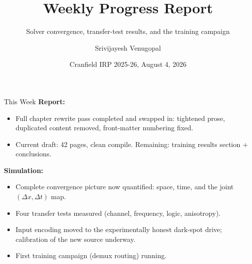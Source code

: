 \documentclass[aspectratio=169,11pt]{beamer}
\title{Weekly Progress Report}
\subtitle{Solver convergence, transfer-test results, and the training campaign}
\author{Srivijayesh Venugopal}
\date{Cranfield IRP 2025-26, August 4, 2026}
\begin{document}
\begin{frame}
\titlepage
\end{frame}

\begin{frame}{This Week}
    \textbf{Report:}
    \begin{itemize}
        \item Full chapter rewrite pass completed and swapped in: tightened prose, duplicated content removed, front-matter numbering fixed.
        \item Current draft: 42 pages, clean compile. Remaining: training results section + conclusions.
    \end{itemize}

    \vspace{0.3cm}
    \textbf{Simulation:}
    \begin{itemize}
        \item Complete convergence picture now quantified: space, time, and the joint $(\Delta x, \Delta t)$ map.
        \item Four transfer tests measured (channel, frequency, logic, anisotropy).
        \item Input encoding moved to the experimentally honest dark-spot drive; calibration of the new source underway.
        \item First training campaign (demux routing) running.
    \end{itemize}
\end{frame}
\end{document}
